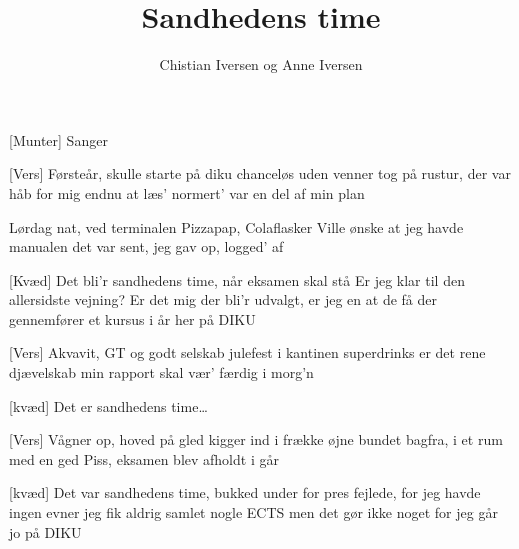 \documentclass[a4paper,11pt]{article}
\title{Sandhedens time}
\author{Chistian Iversen og Anne Iversen}
\begin{document}
\maketitle

\begin{roles}
[Munter] Sanger
\end{roles}

\begin{song}
[Vers] Førsteår, skulle starte på diku
chanceløs uden venner
tog på rustur, der var håb for mig endnu
at læs' normert' var en del af min plan

 Lørdag nat, ved terminalen
Pizzapap, Colaflasker
Ville ønske at jeg havde manualen
det var sent, jeg gav op, logged' af

[Kvæd] Det bli'r sandhedens time, når eksamen skal stå
Er jeg klar til den allersidste vejning?
Er det mig der bli'r udvalgt, er jeg en at de få
der gennemfører et kursus i år her på DIKU

[Vers] Akvavit, GT og godt selskab
julefest i kantinen
superdrinks er det rene djævelskab
min rapport skal vær' færdig i morg'n

[kvæd] Det er sandhedens time\ldots

[Vers] Vågner op, hoved på gled
kigger ind i frække øjne
bundet bagfra, i et rum med en ged
Piss, eksamen blev afholdt i går

[kvæd] Det var sandhedens time, bukked under for pres
fejlede, for jeg havde ingen evner
jeg fik aldrig samlet nogle ECTS
men det gør ikke noget for jeg går jo på DIKU


\end{song}
\end{document}

